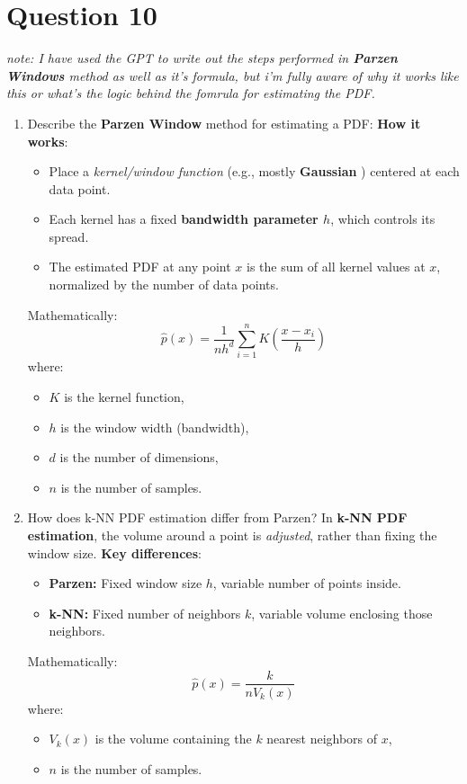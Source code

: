 \documentclass[a4paper,12pt]{article}
\begin{document}
\section*{Question 10}
\textit{note: I have used the GPT to write out the steps performed in \textbf{Parzen Windows} method as well as it's formula, but i'm fully aware of why it works like this or what's the logic behind the fomrula for estimating the PDF.}
\begin{enumerate}[label=(\alph*)]
    \item Describe the \textbf{Parzen Window} method for estimating a PDF:
    \textbf{How it works}:
    \begin{itemize}
    \item Place a \textit{kernel/window function} (e.g., mostly \textbf{Gaussian} ) centered at each data point.
    \item Each kernel has a fixed \textbf{bandwidth parameter $h$}, which controls its spread.
    \item The estimated PDF at any point $x$ is the sum of all kernel values at $x$, normalized by the number of data points.
    \end{itemize}

    Mathematically:
    \[
    \hat{p}(x) = \frac{1}{n h^d} \sum_{i=1}^n K\left(\frac{x - x_i}{h}\right)
    \]
    where:
    \begin{itemize}
    \item $K$ is the kernel function,
    \item $h$ is the window width (bandwidth),
    \item $d$ is the number of dimensions,
    \item $n$ is the number of samples.
    \end{itemize}

    \item How does k-NN PDF estimation differ from Parzen?
    In \textbf{k-NN PDF estimation}, the volume around a point is \textit{adjusted}, rather than fixing the window size.
    \textbf{Key differences}:
    \begin{itemize}
    \item \textbf{Parzen:} Fixed window size $h$, variable number of points inside.
    \item \textbf{k-NN:} Fixed number of neighbors $k$, variable volume enclosing those neighbors.
    \end{itemize}

    Mathematically:
    \[
    \hat{p}(x) = \frac{k}{n V_k(x)}
    \]
    where:
    \begin{itemize}
    \item $V_k(x)$ is the volume containing the $k$ nearest neighbors of $x$,
    \item $n$ is the number of samples.
    \end{itemize}


\end{enumerate}
\end{document}
